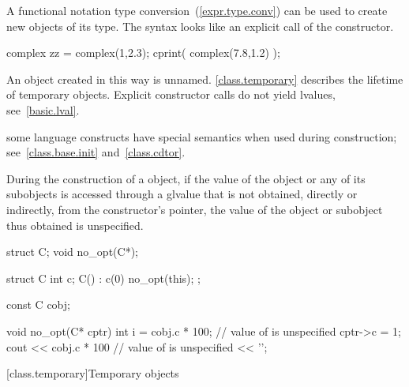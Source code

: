 \pnum
{}%
%
A functional notation type conversion~(\ref{expr.type.conv}) can be used
to create new objects of its type.
\enternote
The syntax looks like an explicit call of the constructor.
\exitnote
\enterexample
{}%

\begin{codeblock}
complex zz = complex(1,2.3);
cprint( complex(7.8,1.2) );
\end{codeblock}
\exitexample

\pnum
An object created in this way is unnamed.
\enternote
\ref{class.temporary} describes the lifetime of temporary objects.
\exitnote
\enternote
Explicit constructor calls do not yield lvalues, see~\ref{basic.lval}.
\exitnote

\pnum
\enternote
{}%
some language constructs have special semantics when used during construction;
see~\ref{class.base.init} and~\ref{class.cdtor}.
\exitnote

\pnum
During the construction of a
object, if the value of the object or any of its subobjects is
accessed through a glvalue that is not obtained, directly or indirectly, from
the constructor's
pointer, the value of the object or subobject thus obtained is unspecified.
\enterexample

\begin{codeblock}
struct C;
void no_opt(C*);

struct C {
  int c;
  C() : c(0) { no_opt(this); }
};

const C cobj;

void no_opt(C* cptr) {
  int i = cobj.c * 100;         // value of  is unspecified
  cptr->c = 1;
  cout << cobj.c * 100          // value of  is unspecified
       << '\n';
}
\end{codeblock}
\exitexample

[class.temporary]{Temporary objects}

